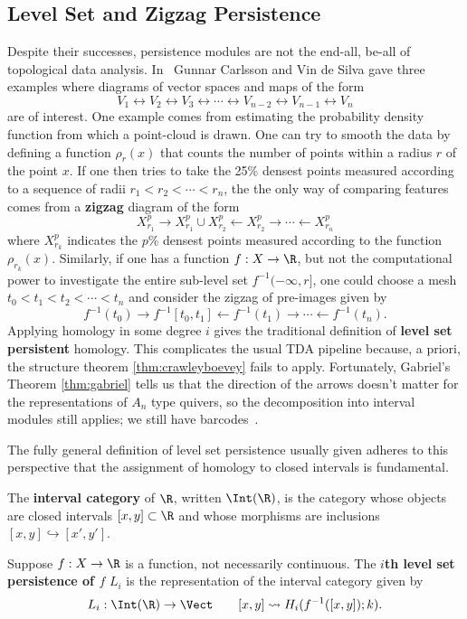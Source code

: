 \subsection{Level Set and Zigzag Persistence}


Despite their successes, persistence modules are not the end-all, be-all of topological data analysis. In~\cite{zigzag} Gunnar Carlsson and Vin de Silva gave three examples where diagrams of vector spaces and maps of the form
\[
	V_1 \leftrightarrow V_2 \leftrightarrow V_3 \leftrightarrow  \cdots \leftrightarrow V_{n-2} \leftrightarrow V_{n-1} \leftrightarrow V_n
\]
are of interest. One example comes from estimating the probability density function from which a point-cloud is drawn. One can try to smooth the data by defining a function $\rho_r(x)$ that counts the number of points within a radius $r$ of the point $x$. If one then tries to take the 25\% densest points measured according to a sequence of radii $r_1<r_2<\cdots <r_n$, the the only way of comparing features comes from a \textbf{zigzag} diagram of the form
\[
X_{r_1}^p \rightarrow X_{r_1}^p\cup X_{r_2}^p \leftarrow X_{r_2}^p \rightarrow \cdots \leftarrow X_{r_n}^p  
\]
where $X^p_{r_k}$ indicates the $p\%$ densest points measured according to the function $\rho_{r_k}(x)$. Similarly, if one has a function $f:X\to\R$, but not the computational power to investigate the entire sub-level set $f^{-1}(-\infty,r]$, one could choose a mesh $t_0<t_1<t_2<\cdots <t_n$ and consider the zigzag of pre-images given by
\[
f^{-1}(t_0)\rightarrow f^{-1}[t_0,t_1]\leftarrow f^{-1}(t_1) \rightarrow \cdots \leftarrow f^{-1}(t_n).
\]
Applying homology in some degree $i$ gives the traditional definition of \textbf{level set persistent} homology. This complicates the usual TDA pipeline because, a priori, the structure theorem \ref{thm:crawleyboevey} fails to apply. Fortunately, Gabriel's Theorem \ref{thm:gabriel} tells us that the direction of the arrows doesn't matter for the representations of $A_n$ type quivers, so the decomposition into interval modules still applies; we still have barcodes~\cite{zigzag}.

The fully general definition of level set persistence usually given adheres to this perspective that the assignment of homology to closed intervals is fundamental.
\begin{defn}
The \textbf{interval category} of $\R$, written $\Int(\R)$, is the category whose objects are closed intervals $[x,y]\subset \R$ and whose morphisms are inclusions $[x,y]\hookrightarrow [x',y']$.
\end{defn}
\begin{defn}
Suppose $f:X\to \R$ is a function, not necessarily continuous. The \textbf{$i$th level set persistence of $f$} $L_i$ is the representation of the interval category given by
\[
L_i:\Int(\R)\to\Vect \qquad [x,y]\rightsquigarrow H_i(f^{-1}([x,y]);k).
\]
\end{defn}

